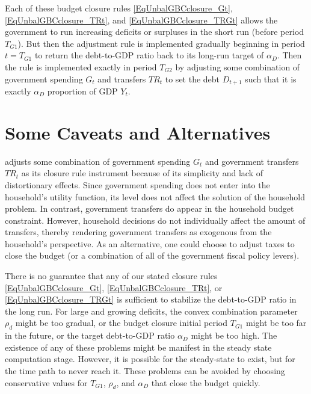     Each of these budget closure rules \eqref{EqUnbalGBCclosure_Gt}, \eqref{EqUnbalGBCclosure_TRt}, and \eqref{EqUnbalGBCclosure_TRGt} allows the government to run increasing deficits or surpluses in the short run (before period $T_{G1}$). But then the adjustment rule is implemented gradually beginning in period $t=T_{G1}$ to return the debt-to-GDP ratio back to its long-run target of $\alpha_D$. Then the rule is implemented exactly in period $T_{G2}$ by adjusting some combination of government spending $G_t$ and transfers $TR_t$ to set the debt $D_{t+1}$ such that it is exactly $\alpha_D$ proportion of GDP $Y_t$.


\section{Some Caveats and Alternatives}\label{SecUnbalGBCcaveat}

  \ogindia adjusts some combination of government spending $G_t$ and government transfers $TR_t$ as its closure rule instrument because of its simplicity and lack of distortionary effects. Since government spending does not enter into the household's utility function, its level does not affect the solution of the household problem. In contrast, government transfers do appear in the household budget constraint. However, household decisions do not individually affect the amount of transfers, thereby rendering government transfers as exogenous from the household's perspective. As an alternative, one could choose to adjust taxes to close the budget (or a combination of all of the government fiscal policy levers).

  There is no guarantee that any of our stated closure rules \eqref{EqUnbalGBCclosure_Gt}, \eqref{EqUnbalGBCclosure_TRt}, or \eqref{EqUnbalGBCclosure_TRGt} is sufficient to stabilize the debt-to-GDP ratio in the long run. For large and growing deficits, the convex combination parameter $\rho_d$ might be too gradual, or the budget closure initial period $T_{G1}$ might be too far in the future, or the target debt-to-GDP ratio $\alpha_D$ might be too high. The existence of any of these problems might be manifest in the steady state computation stage. However, it is possible for the steady-state to exist, but for the time path to never reach it. These problems can be avoided by choosing conservative values for $T_{G1}$, $\rho_d$, and $\alpha_D$ that close the budget quickly.

